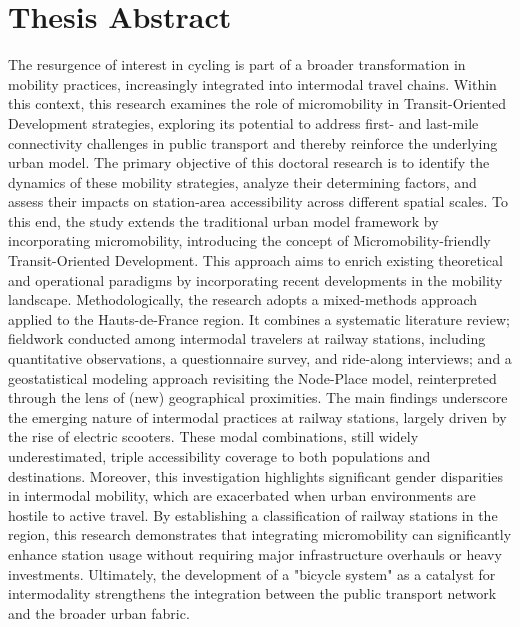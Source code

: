 {%

\section*{Thesis Abstract
    \label{body:resume-these-français}
    }

\footnotesize{The resurgence of interest in cycling is part of a broader transformation in mobility practices, increasingly integrated into intermodal travel chains. Within this context, this research examines the role of micromobility in Transit-Oriented Development strategies, exploring its potential to address first- and last-mile connectivity challenges in public transport and thereby reinforce the underlying urban model. The primary objective of this doctoral research is to identify the dynamics of these mobility strategies, analyze their determining factors, and assess their impacts on station-area accessibility across different spatial scales. To this end, the study extends the traditional urban model framework by incorporating micromobility, introducing the concept of Micromobility-friendly Transit-Oriented Development. This approach aims to enrich existing theoretical and operational paradigms by incorporating recent developments in the mobility landscape. Methodologically, the research adopts a mixed-methods approach applied to the Hauts-de-France region. It combines a systematic literature review; fieldwork conducted among intermodal travelers at railway stations, including quantitative observations, a questionnaire survey, and ride-along interviews; and a geostatistical modeling approach revisiting the Node-Place model, reinterpreted through the lens of (new) geographical proximities. The main findings underscore the emerging nature of intermodal practices at railway stations, largely driven by the rise of electric scooters. These modal combinations, still widely underestimated, triple accessibility coverage to both populations and destinations. Moreover, this investigation highlights significant gender disparities in intermodal mobility, which are exacerbated when urban environments are hostile to active travel. By establishing a classification of railway stations in the region, this research demonstrates that integrating micromobility can significantly enhance station usage without requiring major infrastructure overhauls or heavy investments. Ultimately, the development of a "bicycle system" as a catalyst for intermodality strengthens the integration between the public transport network and the broader urban fabric.
}

}
